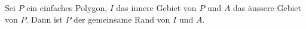 \begin{lemma}   
        Sei $P$ ein einfaches Polygon, $I$ das innere Gebiet von $P$ und $A$ das äussere Gebiet von $P$. 
        Dann ist $P$ der gemeinsame Rand von $I$ und $A$.
\end{lemma}